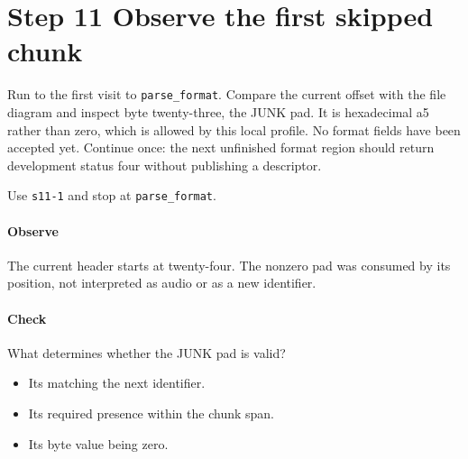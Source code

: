 \section{Step 11 Observe the first skipped chunk}\label{pcm-wav-s11}
Run to the first visit to \texttt{parse\_format}. Compare the current offset with the file diagram and inspect byte twenty-three, the JUNK pad. It is hexadecimal a5 rather than zero, which is allowed by this local profile. No format fields have been accepted yet. Continue once: the next unfinished format region should return development status four without publishing a descriptor.

Use \texttt{s11-1} and stop at \texttt{parse\_format}.

\paragraph{Observe} The current header starts at twenty-four. The nonzero pad was consumed by its position, not interpreted as audio or as a new identifier.

\paragraph{Check} What determines whether the JUNK pad is valid?
\begin{itemize}
\item[A.] Its matching the next identifier.
\item[B.] Its required presence within the chunk span.
\item[C.] Its byte value being zero.
\end{itemize}
